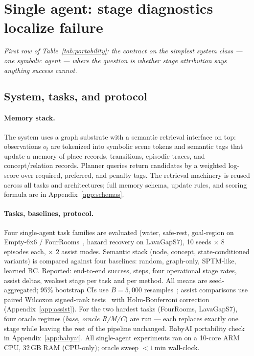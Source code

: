 \documentclass{article}
\begin{document}
\section{Single agent: stage diagnostics localize failure}
\label{sec:single}

\emph{First row of Table~\ref{tab:portability}: the contract on the
simplest system class --- one symbolic agent --- where the question is
whether stage attribution says anything success cannot.}

\subsection{System, tasks, and protocol}
\label{sec:single-setup}

\paragraph{Memory stack.}
The system uses a graph substrate with a semantic retrieval interface on top: observations $o_t$ are tokenized into symbolic scene tokens and semantic tags that update a memory of place records, transitions, episodic traces, and concept/relation records. Planner queries return candidates by a weighted log-score over required, preferred, and penalty tags. The retrieval machinery is reused across all tasks and architectures; full memory schema, update rules, and scoring formula are in Appendix~\ref{app:schemas}.

\paragraph{Tasks, baselines, protocol.}
Four single-agent task families are evaluated (water, safe-rest, goal-region on Empty-6x6 / FourRooms~\citep{sutton1999between}, hazard recovery on LavaGapS7), 10 seeds $\times$ 8 episodes each, $\times$ 2 assist modes. Semantic stack (node, concept, state-conditioned variants) is compared against four baselines: random, graph-only, SPTM-like, learned BC. Reported: end-to-end success, steps, four operational stage rates, assist deltas, weakest stage per task and per method. All means are seed-aggregated; 95\% bootstrap CIs use $B{=}5{,}000$ resamples~\citep{efron1979bootstrap}; assist comparisons use paired Wilcoxon signed-rank tests~\citep{wilcoxon1945individual} with Holm-Bonferroni correction~\citep{holm1979simple} (Appendix~\ref{app:assist}). For the two hardest tasks (FourRooms, LavaGapS7), four oracle regimes (\emph{base}, \emph{oracle R/M/C}) are run — each replaces exactly one stage while leaving the rest of the pipeline unchanged. BabyAI portability check in Appendix~\ref{app:babyai}. All single-agent experiments ran on a 10-core ARM CPU, 32\,GB RAM (CPU-only); oracle sweep $<1$\,min wall-clock.
\end{document}
